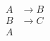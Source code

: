 \documentclass[preview,border=4pt]{standalone}
\begin{document}
\[
\begin{aligned}
        A &\rightarrow B\\
        B &\rightarrow C\\
        A
      \end{aligned}
\]
\end{document}

